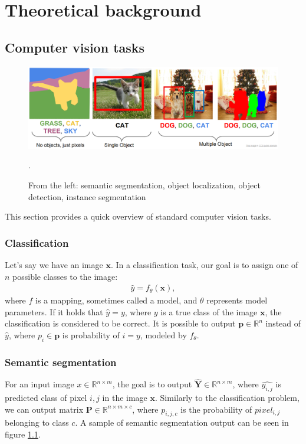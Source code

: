 \chapter{Theoretical background}
\label{chapter:theoretical_bg}
\section{Computer vision tasks}
\begin{figure}
    \centering
    \includegraphics[width=\linewidth]{images/computer_vision_tasks.png}
    \caption{From the left: semantic segmentation, object localization, object detection, instance segmentation}.
    \label{fig:computer_vision_tasks}
\end{figure}
This section provides a quick overview of standard computer vision tasks.
\subsection{Classification}
Let's say we have an image $\mathbf{x}$. In a classification task, our goal is to assign one of $n$ possible classes to the image:
\begin{align}
    \hat{y} = f_\theta\left(\mathbf{x} \right),
\end{align}
where $f$ is a mapping, sometimes called a model, and $\theta$  represents model parameters. If it holds that $\hat{y}=y$, where $y$ is a true class of the image $\mathbf{x}$, the classification is considered to be correct.
It is possible to output $\mathbf{p} \in \mathbb{R}^n$ instead of $\hat{y}$, where $p_i \in \mathbf{p}$ is probability of $i = y$, modeled by $f_\theta$.

\subsection{Semantic segmentation}
For an input image $x \in \mathbb{R}^{n \times m}$, the goal is to output $\mathbf{\hat{Y}} \in \mathbb{R}^{n \times m}$, where $\hat{y_{i,j}}$ is predicted class of pixel $i,j$ in the image $\mathbf{x}$. Similarly to the classification problem, we can output matrix $\mathbf{P} \in \mathbb{R}^{n \times m \times c}$, where $p_{i,j,c}$ is the probability of $pixel_{i,j}$ belonging to class $c$. A sample of semantic segmentation output can be seen in figure \ref{fig:computer_vision_tasks}.

